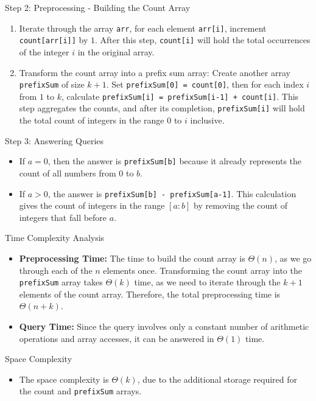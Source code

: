\documentclass[11pt]{article}
\theoremstyle{definition}
\begin{document}
    Step 2: Preprocessing - Building the Count Array
    \begin{enumerate}
        \item Iterate through the array \texttt{arr}, for each element \texttt{arr[i]}, increment \texttt{count[arr[i]]} by \(1\). After this step, \texttt{count[i]} will hold the total occurrences of the integer \(i\) in the original array.
        \item Transform the count array into a prefix sum array: Create another array \texttt{prefixSum} of size \(k+1\). Set \texttt{prefixSum[0] = count[0]}, then for each index \(i\) from \(1\) to \(k\), calculate \texttt{prefixSum[i] = prefixSum[i-1] + count[i]}. This step aggregates the counts, and after its completion, \texttt{prefixSum[i]} will hold the total count of integers in the range \(0\) to \(i\) inclusive.
    \end{enumerate}
    
    Step 3: Answering Queries
    \begin{itemize}
        \item If \(a = 0\), then the answer is \texttt{prefixSum[b]} because it already represents the count of all numbers from \(0\) to \(b\).
        \item If \(a > 0\), the answer is \texttt{prefixSum[b] - prefixSum[a-1]}. This calculation gives the count of integers in the range \([a:b]\) by removing the count of integers that fall before \(a\).
    \end{itemize}
    
    Time Complexity Analysis
    \begin{itemize}
        \item \textbf{Preprocessing Time:} The time to build the count array is \(\Theta(n)\), as we go through each of the \(n\) elements once. Transforming the count array into the \texttt{prefixSum} array takes \(\Theta(k)\) time, as we need to iterate through the \(k+1\) elements of the count array. Therefore, the total preprocessing time is \(\Theta(n + k)\).
        \item \textbf{Query Time:} Since the query involves only a constant number of arithmetic operations and array accesses, it can be answered in \(\Theta(1)\) time.
    \end{itemize}
    
    Space Complexity
    \begin{itemize}
        \item The space complexity is \(\Theta(k)\), due to the additional storage required for the count and \texttt{prefixSum} arrays.
    \end{itemize}
    
\end{document}
